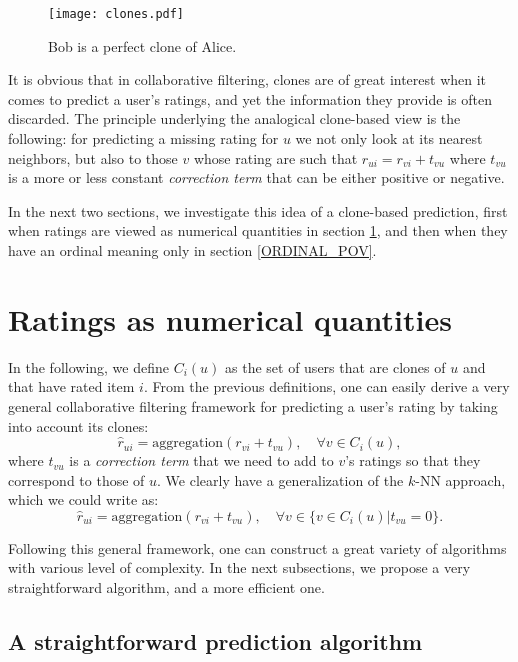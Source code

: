 \documentclass[conference]{IEEEtran}
\newcommand{\predr}[1]{\hat{r}_{#1}}
\begin{document}
\begin{figure}[!h]
\centering
\texttt{[image: clones.pdf]}
\caption{Bob is a perfect clone of Alice.}
\label{FIG_CLONES}
\end{figure}

It is obvious that in collaborative filtering, clones are of great interest when
it comes to predict a user's ratings, and yet the information they provide is
often discarded.  The principle underlying the analogical clone-based view is
the following: for predicting a missing rating for $u$ we not only look at its
nearest neighbors, but also to those $v$ whose rating are such that $r_{ui} =
r_{vi} + t_{vu}$ where $t_{vu}$ is a more or less constant \textit{correction
term} that can be either positive or negative.

In the next two sections, we investigate this idea of a clone-based prediction,
first when ratings are viewed as numerical quantities in section
\ref{NUMERICAL_POV}, and then when they have an ordinal meaning only in
section \ref{ORDINAL_POV}.

\section{Ratings as numerical quantities}
\label{NUMERICAL_POV}

In the following, we define $C_i(u)$ as the set of users that are clones of $u$
and that have rated item $i$.  From the previous definitions, one can easily
derive a very general collaborative filtering framework for predicting a user's
rating by taking into account its clones:
$$\predr{ui} = \text{aggregation}(r_{vi} + t_{vu}), \quad \forall v \in
C_i(u),$$
where $t_{vu}$ is a \textit{correction term} that we need to add to $v$'s
ratings so that they correspond to those of $u$. We clearly have a
generalization of the $k$-NN approach, which we could write as:
$$\predr{ui} = \text{aggregation}(r_{vi} + t_{vu}), \quad \forall v \in \{v \in C_i(u)
  | t_{vu} = 0\}.$$

Following this general framework, one can construct a great variety of
algorithms with various level of complexity. In the next subsections, we
propose a very straightforward algorithm, and a more efficient one.

\subsection{A straightforward prediction algorithm}
\label{STRAIGHTFORWARD}
\end{document}
